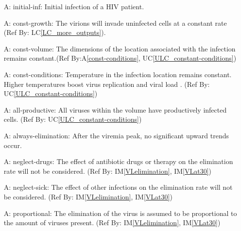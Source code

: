 \documentclass[12pt]{article}
\newcounter{assumpnum} %
\newcommand{\aref}[1]{A\ref{#1}}
\newcommand{\iref}[1]{IM\ref{#1}}
\newcommand{\lcref}[1]{LC\ref{#1}}
\newcommand{\ucref}[1]{UC\ref{#1}}
\begin{document}
  
\begin{itemize}

\item[A\refstepcounter{assumpnum}\theassumpnum \label{initial-inf}:]
initial-inf: Initial infection of a HIV patient.

\item[A\refstepcounter{assumpnum}\theassumpnum \label{const-growth}:]
const-growth: The virions will invade uninfected cells at a constant 
rate (Ref By: \lcref{LC_more_outputs}).
  
\item[A\refstepcounter{assumpnum}\theassumpnum \label{const-volume}:]
const-volume: The dimensions of the location associated with the 
infection remains constant.(Ref By:\aref{const-conditions}, \ucref{ULC_constant-conditions})
  
\item[A\refstepcounter{assumpnum}\theassumpnum \label{const-conditions}:]
const-conditions: Temperature in the infection location remains constant. 
Higher temperatures boost virus replication and viral load \citep{10.1371/journal.ppat.1002792}. (Ref By:  
\ucref{ULC_constant-conditions})

  
\item[A\refstepcounter{assumpnum}\theassumpnum \label{all-productive}:]
all-productive: All viruses within the volume have productively infected cells. 
(Ref By: 
\ucref{ULC_constant-conditions})
  
\item[A\refstepcounter{assumpnum}\theassumpnum \label{always-elimination}:]
always-elimination: After the viremia peak, no significant upward trends occur.
   
\item[A\refstepcounter{assumpnum}\theassumpnum \label{neglect-drugs}:]
neglect-drugs: The effect of antibiotic drugs or therapy on the elimination rate 
will not be considered. (Ref By: \iref{VLelimination}, \iref{VLat30})
  
\item[A\refstepcounter{assumpnum}\theassumpnum \label{neglect-sick}:]
neglect-sick: The effect of other infections on the elimination rate will not be 
considered. (Ref By: \iref{VLelimination}, \iref{VLat30})

\item[A\refstepcounter{assumpnum}\theassumpnum \label{proportional}:]
proportional: The elimination of the virus is assumed to be proportional to the 
amount of viruses present. (Ref By: \iref{VLelimination}, \iref{VLat30})

\end{itemize}
\end{document}
